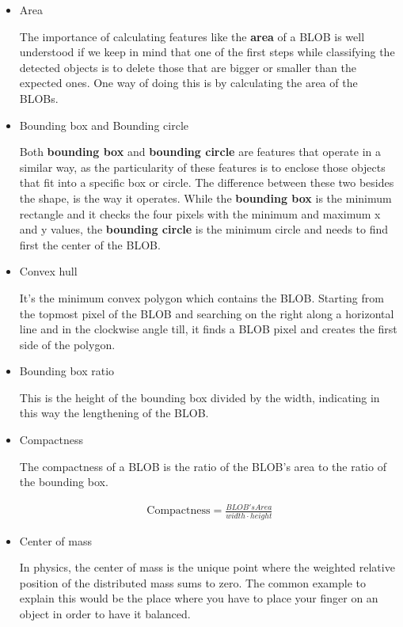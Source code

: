 \begin{itemize}
\item Area

The importance of calculating features like the \textbf{area} of a BLOB is well understood if we keep in mind that one of the first steps while classifying the detected objects is to delete those that are bigger or smaller than the expected ones. One way of doing this is by calculating the area of the BLOBs.

\item Bounding box and Bounding circle

Both \textbf{bounding box} and \textbf{bounding circle} are features that operate in a similar way, as the particularity of these features is to enclose those objects that fit into a specific box or circle. The difference between these two besides the shape, is the way it operates. While the \textbf{bounding box} is the minimum rectangle and it checks the four pixels with the minimum and maximum x and y values, the \textbf{bounding circle} is the minimum circle and needs to find first the center of the BLOB.

\item Convex hull

It's the minimum convex polygon which contains the BLOB. Starting from the topmost pixel of the BLOB and searching on the right along a horizontal line and in the clockwise angle till, it finds a BLOB pixel and creates the first side of the polygon.

\item Bounding box ratio

This is the height of the bounding box divided by the width, indicating in this way the lengthening of the BLOB.

\item Compactness

The compactness of a BLOB is the ratio of the BLOB's area to the ratio of the bounding box.

\begin{equation}
	\begin{aligned}
	\text{Compactness}=\displaystyle\frac{BLOB's Area}{width\cdot{height}}
	\label{Compact}
	\end{aligned}
\end{equation}


\item Center of mass

In physics, the center of mass is the unique point where the weighted relative position of the distributed mass sums to zero. The common example to explain this would be the place where you have to place your finger on an object in order to have it balanced.


\end{itemize}
